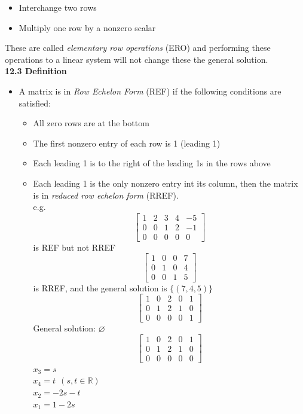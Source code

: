 \documentclass[]{article}
\let\emptyset\varnothing
\begin{document}
\begin{enumerate}
\begin{itemize}
				\item Interchange two rows
				\item Multiply one row by a nonzero scalar
			\end{itemize}
			These are called \emph{elementary row operations} (ERO) and performing these operations to a linear system will not change these the general solution.\\
			{\bf 12.3 Definition}
			\begin{itemize}
				\item A matrix is in \emph{Row Echelon Form} (REF) if the following conditions are satisfied:
				\begin{itemize}
					\item All zero rows are at the bottom
					\item The first nonzero entry of each row is 1 (leading 1)
					\item Each leading 1 is to the right of the leading 1s in the rows above
					\item Each leading 1 is the only nonzero entry int its column, then the matrix is in \emph{reduced row echelon form} (RREF).\\
					e.g.
					$$
						\left[\begin{array}{cccc|c}
							{1}&{2}&{3}&{4}&{-5}\\
							{0}&{0}&{1}&{2}&{-1}\\
							{0}&{0}&{0}&{0}&{0}
						\end{array}\right]
					$$ is REF but not RREF
					$$
						\left[\begin{array}{ccc|c}
							{1}&{0}&{0}&{7}\\
							{0}&{1}&{0}&{4}\\
							{0}&{0}&{1}&{5}
						\end{array}\right]
					$$ is RREF, and the general solution is $\{(7,4,5)\}$
					$$
						\left[\begin{array}{cccc|c}
							{1}&{0}&{2}&{0}&{1}\\
							{0}&{1}&{2}&{1}&{0}\\
							{0}&{0}&{0}&{0}&{1}
						\end{array}\right]
					$$ General solution: $\emptyset$
					$$
						\left[\begin{array}{cccc|c}
							{1}&{0}&{2}&{0}&{1}\\
							{0}&{1}&{2}&{1}&{0}\\
							{0}&{0}&{0}&{0}&{0}
						\end{array}\right]
					$$
					$x_3=s$\\
					$x_4=t~~(s,t\in\mathbb{R})$\\
					$x_2=-2s-t$\\
					$x_1=1-2s$
				\end{itemize}	
			\end{itemize}
		\end{enumerate}
\end{document}
